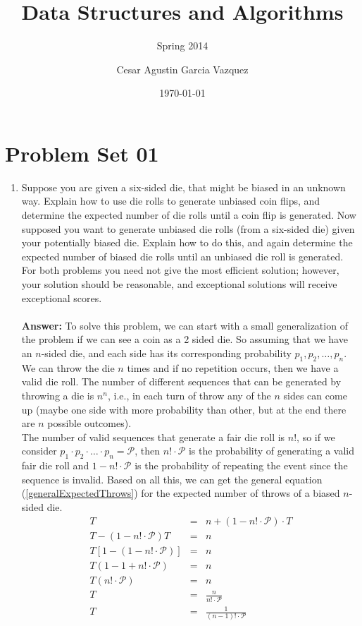 \documentclass[12pt]{scrartcl}
\title{Data Structures and Algorithms}
\subtitle{Spring 2014}
\author{Cesar Agustin Garcia Vazquez}
\date{\today}                                           %
\begin{document}
\maketitle
\section{Problem Set 01}

\begin{enumerate}
	\item Suppose you are given a six-sided die, that might be biased in an unknown way. Explain how to use die rolls to generate unbiased coin flips, and determine the expected number of die rolls until a coin flip is generated. Now supposed you want to generate unbiased die rolls (from a six-sided die) given your potentially biased die. Explain how to do this, and again determine the expected number of biased die rolls until an unbiased die roll is generated. For both problems you need not give the most efficient solution; however, your solution should be reasonable, and exceptional solutions will receive exceptional scores.\\
	\\
	\textbf{Answer:} To solve this problem, we can start with a small generalization of the problem if we can see a coin as a 2 sided die. So assuming that we have an $n$-sided die, and each side has its corresponding probability $p_1, p_2, \ldots, p_n$. We can throw the die $n$ times and if no repetition occurs, then we have a valid die roll. The number of different sequences that can be generated by throwing a die is $n^n$, i.e., in each turn of throw any of the $n$ sides can come up (maybe one side with more probability than other, but at the end there are $n$ possible outcomes).\\
	The number of valid sequences that generate a fair die roll is $n!$, so if we consider $p_1 \cdot p_2 \cdot \ldots \cdot p_n = \mathcal{P}$, then $n! \cdot \mathcal{P}$ is the probability of generating a valid fair die roll and $1 - n! \cdot \mathcal{P}$ is the probability of repeating the event since the sequence is invalid. Based on all this, we can get the general equation (\ref{generalExpectedThrows}) for the expected number of throws of a biased $n$-sided die.
	\begin{eqnarray}\label{generalExpectedThrows}
		T 									&	=	&	n + (1 - n! \cdot \mathcal{P}) \cdot T \nonumber \\
		T - (1 - n! \cdot \mathcal{P})T		&	=	&	n \nonumber \\
		T[1 - (1 - n! \cdot \mathcal{P})]	&	=	&	n \nonumber \\
		T(1 - 1 + n! \cdot \mathcal{P})		&	=	&	n \nonumber \\
		T(n! \cdot \mathcal{P})			&	=	&	n \nonumber \\
		T									&	=	&	\frac{n}{n! \cdot \mathcal{P}} \nonumber \\
		T									&	=	&	\frac{1}{(n - 1 )! \cdot \mathcal{P}} 
	\end{eqnarray}
		

\end{enumerate}
\end{document}
